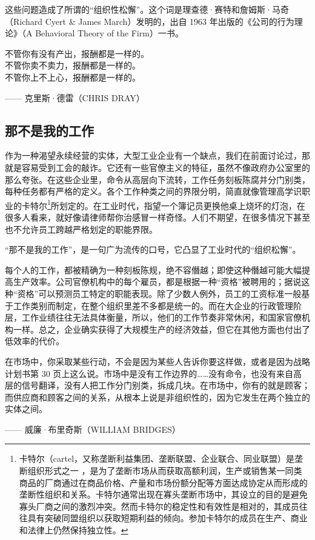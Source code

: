 这些问题造成了所谓的“组织性松懈”。这个词是理查德·赛特和詹姆斯·马奇（Richard Cyert \& James March）发明的，出自 1963 年出版的《公司的行为理论》（A Behavioral Theory of the Firm）一书。

\begin{tcolorbox}
\kaishu 不管你有没有产出，报酬都是一样的。\\
不管你卖不卖力，报酬都是一样的。\\
不管你上不上心，报酬都是一样的。
\begin{flushright}
—— 克里斯·德雷（CHRIS DRAY）
\end{flushright} 
\end{tcolorbox}

\subsection{那不是我的工作}
作为一种渴望永续经营的实体，大型工业企业有一个缺点，我们在前面讨论过，那就是容易受到工会的敲诈。它还有一些官僚主义的特征，虽然不像政府办公室里的那么夸张。在这些企业里，命令从高层向下流转，工作任务刻板陈腐并分门别类，每种任务都有严格的定义。各个工作种类之间的界限分明，简直就像管理高学识职业的卡特尔\footnote{卡特尔（cartel，又称垄断利益集团、垄断联盟、企业联合、同业联盟）是垄断组织形式之一 ，是为了垄断市场从而获取高额利润，生产或销售某一同类商品的厂商通过在商品价格、产量和市场份额分配等方面达成协定从而形成的垄断性组织和关系。卡特尔通常出现在寡头垄断市场中，其设立的目的是避免寡头厂商之间的激烈冲突。然而卡特尔的稳定性和有效性是相对的，其成员往往具有突破同盟组织以获取短期利益的倾向。参加卡特尔的成员在生产、商业和法律上仍然保持独立性。}所划定的。在工业时代，指望一个簿记员更换他桌上烧坏的灯泡，在很多人看来，就好像请律师帮你治感冒一样奇怪。人们不期望，在很多情况下甚至也不允许员工跨越严格划定的职能界限。

“那不是我的工作”，是一句广为流传的口号，它凸显了工业时代的“组织松懈”。

每个人的工作，都被精确为一种刻板陈规，绝不容僭越；即使这种僭越可能大幅提高生产效率。公司官僚机构中的每个雇员，都是根据一种“资格”被聘用的；据说这种“资格”可以预测员工特定的职能表现。除了少数人例外，员工的工资标准一般基于工作类别而制定，在整个组织里差不多都是统一的。而在大企业的行政管理阶层，工作业绩往往无法具体衡量，所以，他们的工作节奏非常休闲，和国家官僚机构一样。总之，企业确实获得了大规模生产的经济效益，但它在其他方面也付出了低效率的代价。

\begin{tcolorbox}
\kaishu 在市场中，你采取某些行动，不会是因为某些人告诉你要这样做，或者是因为战略计划书第 30 页上这么说。市场中是没有工作边界的……没有命令，也没有来自高层的信号翻译，没有人把工作分门别类，拆成几块。在市场中，你有的就是顾客；而供应商和顾客之间的关系，从根本上说是非组织性的，因为它发生在两个独立的实体之间。
\begin{flushright}
—— 威廉·布里奇斯（WILLIAM BRIDGES） 
\end{flushright}
\end{tcolorbox}

